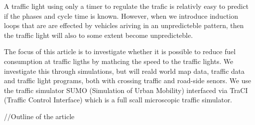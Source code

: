 A traffic light using only a timer to regulate the trafic is relativly easy to predict if the phases and cycle time is known. 
However, when we introduce induction loops that are are effected by vehicles ariving in an unpredicteble pattern, then the traffic light will also to some extent become unpredicteble. 

The focus of this article is to investigate whether it is possible to reduce fuel consumption at traffic ligths by mathcing the speed to the traffic lights. We investigate this through simulations, but will reald world map data, traffic data and traffic light programs, %
both with crossing traffic and road-side senors.
We use the traffic simulator SUMO (Simulation of Urban Mobility)\cite{sumo} interfaced via TraCI (Traffic Control Interface)\cite{traci} which is a full scall microscopic traffic simulator.

//Outline of the article





